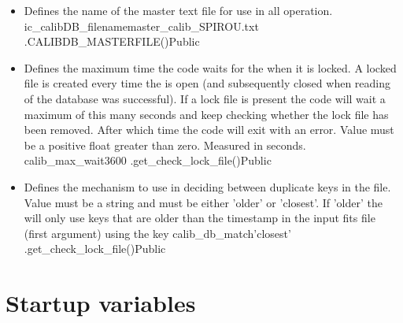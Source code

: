 \begin{itemize}

\item {} 
{Defines the name of the master \calibdb text file for use in all \calibdb operation.}
{ic\_calibDB\_filename}{master\_calib{\hskip 0pt}\_SPIROU.txt}
{\AllRecipes}{\constantsfile}{\spirouConst.CALIBDB\_MASTERFILE()}{Public}


\item {}
{Defines the maximum time the code waits for the \calibdb when it is locked. A locked file is created every time the \calibdb is open (and subsequently closed when reading of the database was successful). If a lock file is present the code will wait a maximum of this many seconds and keep checking whether the lock file has been removed. After which time the code will exit with an error. Value must be a positive float greater than zero. Measured in seconds.}
{calib\_max\_wait}{3600}
{\AllRecipes}{\constantsfile}{\spirouCDB.get\_check\_lock\_file()}{Public}


\item {} 
{Defines the mechanism to use in deciding between duplicate keys in the \calibdb file. Value must be a string and must be either 'older' or 'closest'. If 'older' the \calibdb will only use keys that are older than the timestamp in the input fits file (first argument) using the key }
{calib\_db\_match}{'closest'}
{\AllRecipes}{\constantsfile}{\spirouCDB.get\_check\_lock\_file()}{Public}

\end{itemize}








\ifdevguide
\clearpage
\newpage
\section{Startup variables}
\label{ch:variables:startup}

